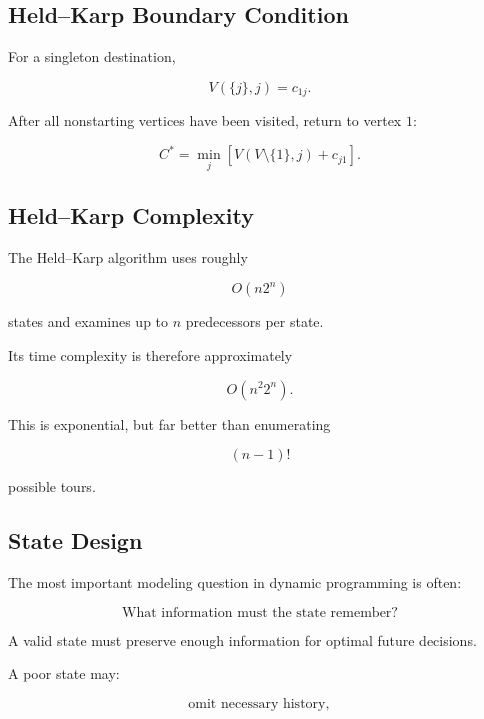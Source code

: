 \subsection{Held--Karp Boundary Condition}
\label{subsec:held-karp-boundary}

For a singleton destination,

\[
\boxed{
V(\{j\},j)
=
c_{1j}.
}
\]

After all nonstarting vertices have been visited, return to vertex \(1\):

\[
\boxed{
C^*
=
\min_j
\left[
V(V\setminus\{1\},j)
+
c_{j1}
\right].
}
\]

\subsection{Held--Karp Complexity}
\label{subsec:held-karp-complexity}

The Held--Karp algorithm uses roughly

\[
\boxed{
O(n2^n)
}
\]

states and examines up to \(n\) predecessors per state.

Its time complexity is therefore approximately

\[
\boxed{
O(n^2 2^n).
}
\]

This is exponential, but far better than enumerating

\[
\boxed{
(n-1)!
}
\]

possible tours.

\subsection{State Design}
\label{subsec:dynamic-programming-state-design}

The most important modeling question in dynamic programming is often:

\[
\boxed{
\text{What information must the state remember?}
}
\]

A valid state must preserve enough information for optimal future
decisions.

A poor state may:

\[
\boxed{
\text{omit necessary history},
}
\]

